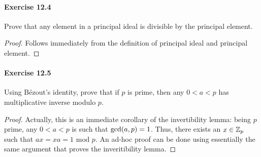 \paragraph{Exercise 12.4}
Prove that any element in a principal ideal is divisible by the principal element.

\begin{proof}  
Follows immediately from the definition of principal ideal and principal element.
\end{proof}


\paragraph{Exercise 12.5}
Using B\'ezout's identity, prove that if $p$ is prime, then any $0 < a <p$ has
multiplicative inverse modulo $p$.

\begin{proof}  
Actually, this is an immediate corollary of the invertibility lemma: being $p$ 
prime, any $0 < a < p$ is such that $\textrm{gcd}(a, p) = 1$. Thus, there exists an $x \in
\mathbb{Z}_{p}$ such that $a x = x a = 1 \textrm{ mod } p$. An ad-hoc proof can be done
using essentially the same argument that proves the inveritibility lemma. 
\end{proof}
